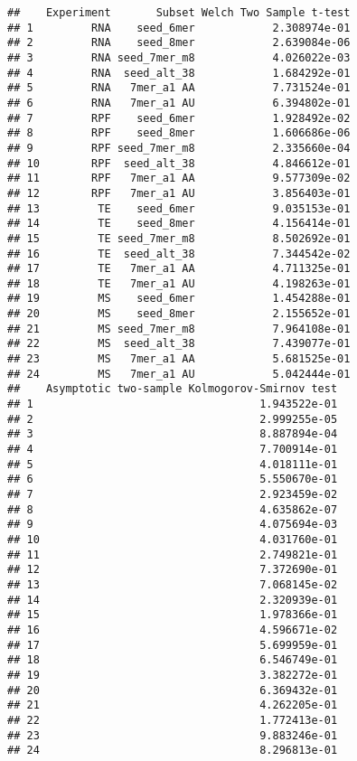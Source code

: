 \documentclass[
]{article}
\begin{document}
\begin{verbatim}
##    Experiment       Subset Welch Two Sample t-test
## 1         RNA    seed_6mer            2.308974e-01
## 2         RNA    seed_8mer            2.639084e-06
## 3         RNA seed_7mer_m8            4.026022e-03
## 4         RNA  seed_alt_38            1.684292e-01
## 5         RNA   7mer_a1 AA            7.731524e-01
## 6         RNA   7mer_a1 AU            6.394802e-01
## 7         RPF    seed_6mer            1.928492e-02
## 8         RPF    seed_8mer            1.606686e-06
## 9         RPF seed_7mer_m8            2.335660e-04
## 10        RPF  seed_alt_38            4.846612e-01
## 11        RPF   7mer_a1 AA            9.577309e-02
## 12        RPF   7mer_a1 AU            3.856403e-01
## 13         TE    seed_6mer            9.035153e-01
## 14         TE    seed_8mer            4.156414e-01
## 15         TE seed_7mer_m8            8.502692e-01
## 16         TE  seed_alt_38            7.344542e-02
## 17         TE   7mer_a1 AA            4.711325e-01
## 18         TE   7mer_a1 AU            4.198263e-01
## 19         MS    seed_6mer            1.454288e-01
## 20         MS    seed_8mer            2.155652e-01
## 21         MS seed_7mer_m8            7.964108e-01
## 22         MS  seed_alt_38            7.439077e-01
## 23         MS   7mer_a1 AA            5.681525e-01
## 24         MS   7mer_a1 AU            5.042444e-01
##    Asymptotic two-sample Kolmogorov-Smirnov test
## 1                                   1.943522e-01
## 2                                   2.999255e-05
## 3                                   8.887894e-04
## 4                                   7.700914e-01
## 5                                   4.018111e-01
## 6                                   5.550670e-01
## 7                                   2.923459e-02
## 8                                   4.635862e-07
## 9                                   4.075694e-03
## 10                                  4.031760e-01
## 11                                  2.749821e-01
## 12                                  7.372690e-01
## 13                                  7.068145e-02
## 14                                  2.320939e-01
## 15                                  1.978366e-01
## 16                                  4.596671e-02
## 17                                  5.699959e-01
## 18                                  6.546749e-01
## 19                                  3.382272e-01
## 20                                  6.369432e-01
## 21                                  4.262205e-01
## 22                                  1.772413e-01
## 23                                  9.883246e-01
## 24                                  8.296813e-01
\end{verbatim}
\end{document}
